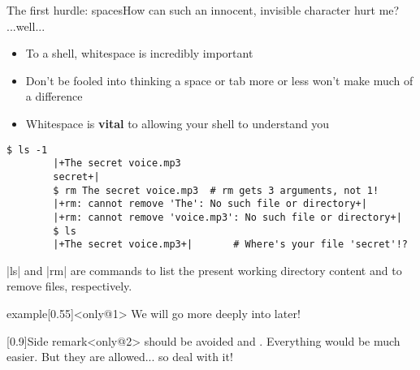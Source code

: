 \begin{frame}[fragile]{The first hurdle: spaces}{How can such an innocent, invisible character hurt me? ...well...}
    \vspace{-3mm}
    \begin{itemize}
        \item To a shell, whitespace is incredibly important
        \item Don't be fooled into thinking a space or tab more or less won't make much of a difference
        \item  Whitespace is \textbf{vital} to allowing your shell to understand you
    \end{itemize}
    \begin{lstlisting}[style=MyBash, aboveskip=4mm]
        $ ls -1
        |+The secret voice.mp3
        secret+|
        $ rm The secret voice.mp3  # rm gets 3 arguments, not 1!
        |+rm: cannot remove 'The': No such file or directory+|
        |+rm: cannot remove 'voice.mp3': No such file or directory+|
        $ ls
        |+The secret voice.mp3+|       # Where's your file 'secret'!?
    \end{lstlisting}
    \centerline{\ssmall \bash|ls| and \bash|rm| are commands to list the present working directory content and to remove files, respectively.}
    \vspace{-3mm}
    \begin{overlayarea}{\textwidth}{0.3\textheight}
        \begin{varblock}{example}[0.55\textwidth]{}<only@1>
            We will go more deeply into  later!
        \end{varblock}
        \begin{varblock}{}[0.9\textwidth]{Side remark}<only@2>
             should be avoided and . Everything would be much easier. But they are allowed... so deal with it!
        \end{varblock}
    \end{overlayarea}
\end{frame}
